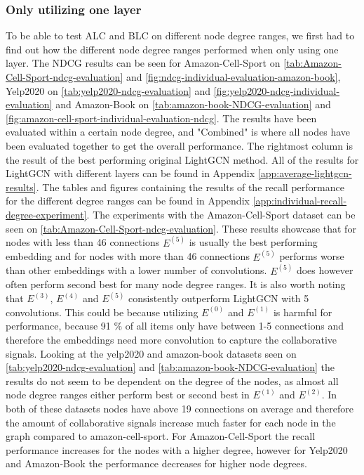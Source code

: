 \subsubsection{Only utilizing one layer}
To be able to test ALC and BLC on different node degree ranges, we first had to find out how the different node degree ranges performed when only using one layer.
The NDCG results can be seen for Amazon-Cell-Sport on \autoref{tab:Amazon-Cell-Sport-ndcg-evaluation} and \autoref{fig:ndcg-individual-evaluation-amazon-book}, Yelp2020 on \autoref{tab:yelp2020-ndcg-evaluation} and \autoref{fig:yelp2020-ndcg-individual-evaluation} and Amazon-Book on \autoref{tab:amazon-book-NDCG-evaluation} and \autoref{fig:amazon-cell-sport-individual-evaluation-ndcg}.
The results have been evaluated within a certain node degree, and "Combined" is where all nodes have been evaluated together to get the overall performance.
The rightmost column is the result of the best performing original LightGCN method.
All of the results for LightGCN with different layers can be found in Appendix \ref{app:average-lightgcn-results}.
The tables and figures containing the results of the recall performance for the different degree ranges can be found in Appendix \ref{app:individual-recall-degree-experiment}.
The experiments with the Amazon-Cell-Sport dataset can be seen on \autoref{tab:Amazon-Cell-Sport-ndcg-evaluation}.
These results showcase that for nodes with less than 46 connections $E^{(5)}$ is usually the best performing embedding and for nodes with more than 46 connections $E^{(5)}$ performs worse than other embeddings with a lower number of convolutions.
$E^{(5)}$ does however often perform second best for many node degree ranges.
It is also worth noting that $E^{(3)}$, $E^{(4)}$ and $E^{(5)}$ consistently outperform LightGCN with 5 convolutions.
This could be because utilizing $E^{(0)}$ and $E^{(1)}$ is harmful for performance, because 91 \% of all items only have between 1-5 connections and therefore the embeddings need more convolution to capture the collaborative signals.
Looking at the yelp2020 and amazon-book datasets seen on \autoref{tab:yelp2020-ndcg-evaluation} and \autoref{tab:amazon-book-NDCG-evaluation} the results do not seem to be dependent on the degree of the nodes, as almost all node degree ranges either perform best or second best in $E^{(1)}$ and $E^{(2)}$.
In both of these datasets nodes have above 19 connections on average and therefore the amount of collaborative signals increase much faster for each node in the graph compared to amazon-cell-sport.
For Amazon-Cell-Sport the recall performance increases for the nodes with a higher degree, however for Yelp2020 and Amazon-Book the performance decreases for higher node degrees.
